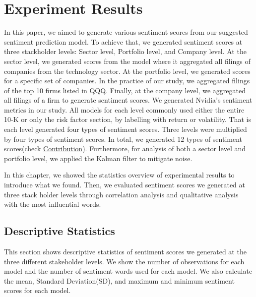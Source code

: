 \documentclass[logo,bsc,singlespacing,parskip]{infthesis}
\begin{document}
\chapter{Experiment Results}
In this paper, we aimed to generate various sentiment scores from our suggested sentiment prediction model. To achieve that, we generated sentiment scores at three stackholder levels: Sector level, Portfolio level, and Company level. At the sector level, we generated scores from the model where it aggregated all filings of companies from the technology sector. At the portfolio level, we generated scores for a specific set of companies. In the practice of our study, we aggregated filings of the top 10 firms listed in QQQ. Finally, at the company level, we aggregated all filings of a firm to generate sentiment scores. We generated Nvidia’s sentiment metrics in our study. All models for each level commonly used either the entire 10-K or only the risk factor section, by labelling with return or volatility. That is each level generated four types of sentiment scores. Three levels were multiplied by four types of sentiment scores. In total, we generated 12 types of sentiment scores(check \hyperref[sec:contribution]{Contribution}). Furthermore, for analysis of both a sector level and portfolio level, we applied the Kalman filter to mitigate noise.

In this chapter, we showed the statistics overview of experimental results to introduce what we found. Then, we evaluated sentiment scores we generated at three stack holder levels through correlation analysis and qualitative analysis with the most influential words. 

\section{Descriptive Statistics}
\label{descriptive_statistics}
This section shows descriptive statistics of sentiment scores we generated at the three different stakeholder levels. We show the number of observations for each model and the number of sentiment words used for each model. We also calculate the mean, Standard Deviation(SD), and maximum and minimum sentiment scores for each model.
\end{document}
